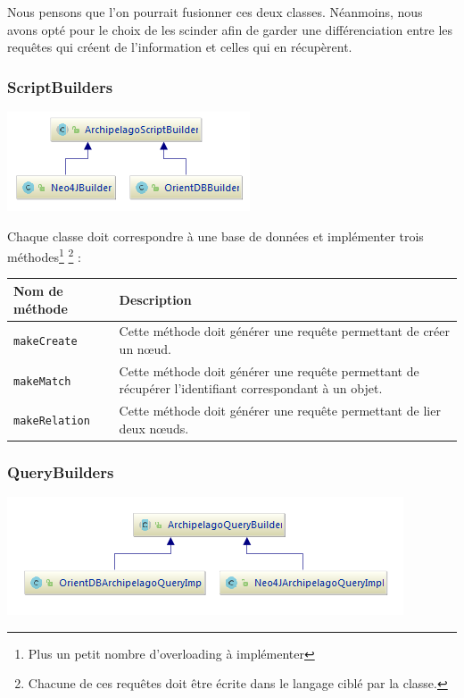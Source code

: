 \documentclass[a4paper,fleqn,12pt]{report}
\begin{document}
Nous pensons que l'on pourrait fusionner ces deux classes. Néanmoins, nous avons opté pour le choix de les scinder afin de garder une différenciation entre les requêtes qui créent de l'information et celles qui en récupèrent.


\subsubsection{ScriptBuilders}


\begin{center}
\includegraphics[scale=1.5]{figures/scriptBuilders.png}
\label{fig:ScriptQuery}
\end{center}

Chaque classe doit correspondre à une base de données et implémenter trois méthodes\footnote{Plus un petit nombre d'overloading à implémenter} \footnote{Chacune de ces requêtes doit être écrite dans le langage ciblé par la classe.} :

\begin{tabular}[c]{|l|M{12cm}|}

\hline
\textbf{Nom de méthode} & \textbf{Description}  \tabularnewline
\hline
\texttt{makeCreate} &  Cette méthode doit générer une requête permettant de créer un nœud. \tabularnewline
\hline
\texttt{makeMatch} & Cette méthode doit générer une requête permettant de récupérer l'identifiant correspondant à un objet. \tabularnewline
\hline
\texttt{makeRelation} &  Cette méthode doit générer une requête permettant de lier deux nœuds.  \tabularnewline
\hline

\end{tabular}

\subsubsection{QueryBuilders}

\begin{center}
\includegraphics[scale=1.5]{figures/queryBuilders.png}
\label{fig:QueryBuilders}
\end{center}
\end{document}
